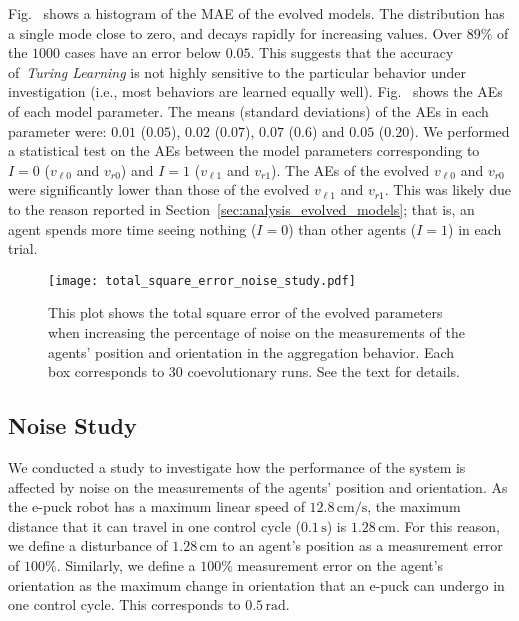Fig.~ shows a histogram of the MAE of the evolved models. The distribution has a single mode close to zero, and decays rapidly for increasing values. Over $89\%$ of the $1000$ cases have an error below $0.05$. This suggests that the accuracy of~\textit{Turing Learning} is not highly sensitive to the particular behavior under investigation (i.e., most behaviors are learned equally well). Fig.~ shows the AEs of each model parameter. The means (standard deviations) of the AEs in each parameter were: $0.01$ ($0.05$), $0.02$ ($0.07$), $0.07$ ($0.6$) and $0.05$ ($0.20$). We performed a statistical test on the AEs between the model parameters corresponding to $I=0$ ($v_{\ell0}$ and $v_{r0}$) and $I=1$ ($v_{\ell1}$ and $v_{r1}$). The AEs of the evolved $v_{\ell0}$ and  $v_{r0}$ were significantly lower than those of the evolved $v_{\ell1}$ and  $v_{r1}$. This was likely due to the reason reported in Section~\ref{sec:analysis_evolved_models}; that is, an agent spends more time seeing nothing ($I=0$) than other agents ($I=1$) in each trial.
\begin{figure}[!h]%
	\centering
	\texttt{[image: total\_square\_error\_noise\_study.pdf]}
	\caption{This plot shows the total square error of the evolved parameters when increasing the percentage of noise on the measurements of the agents' position and orientation in the aggregation behavior. Each box corresponds to 30 coevolutionary runs. See the text for details.
\label{fig:total_square_error_noise_study}}
\end{figure}
\subsection{Noise Study}\label{sec:noise_study_swarm_simulation}

We conducted a study to investigate how the performance of the system is affected by noise on the measurements of the agents' position and orientation. As the e-puck robot has a maximum linear speed of $12.8\,\textrm{cm/s}$, the maximum distance that it can travel in one control cycle ($0.1\,\textrm{s}$) is $1.28\,\textrm{cm}$. For this reason, we define a disturbance of $1.28\,\textrm{cm}$ to an agent's position as a measurement error of $100\%$. Similarly, we define a $100\%$ measurement error on the agent's orientation as the maximum change in orientation that an e-puck can undergo in one control cycle. This corresponds to $0.5\,\textrm{rad}$.

